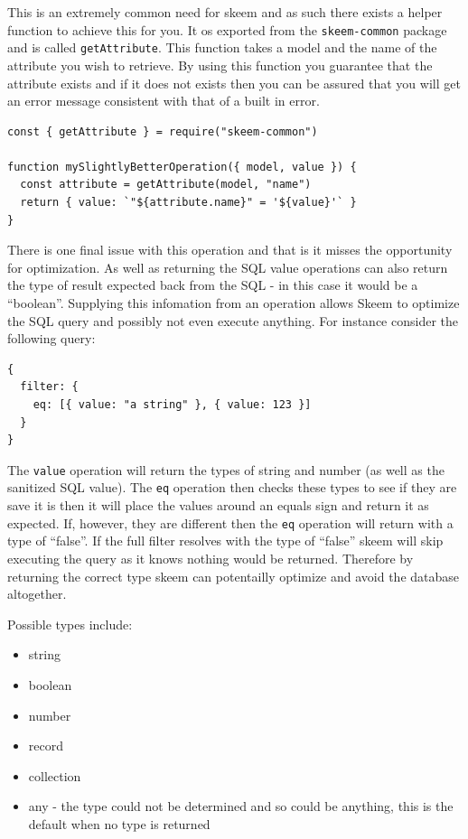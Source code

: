 \documentclass[
  12pt,
]{article}
\newcommand{\passthrough}[1]{#1}
\providecommand{\tightlist}{%
  \setlength{\itemsep}{0pt}\setlength{\parskip}{0pt}}
\begin{document}
This is an extremely common need for skeem and as such there exists a
helper function to achieve this for you. It os exported from the
\passthrough{\lstinline!skeem-common!} package and is called
\passthrough{\lstinline!getAttribute!}. This function takes a model and
the name of the attribute you wish to retrieve. By using this function
you guarantee that the attribute exists and if it does not exists then
you can be assured that you will get an error message consistent with
that of a built in error.

\begin{lstlisting}[caption={Checks to see if name actually exists on the model being queried.}]
const { getAttribute } = require("skeem-common")

function mySlightlyBetterOperation({ model, value }) {
  const attribute = getAttribute(model, "name")
  return { value: `"${attribute.name}" = '${value}'` }
}
\end{lstlisting}

There is one final issue with this operation and that is it misses the
opportunity for optimization. As well as returning the SQL value
operations can also return the type of result expected back from the SQL
- in this case it would be a ``boolean''. Supplying this infomation from
an operation allows Skeem to optimize the SQL query and possibly not
even execute anything. For instance consider the following query:

\begin{lstlisting}
{
  filter: {
    eq: [{ value: "a string" }, { value: 123 }]
  }
}
\end{lstlisting}

The \passthrough{\lstinline!value!} operation will return the types of
string and number (as well as the sanitized SQL value). The
\passthrough{\lstinline!eq!} operation then checks these types to see if
they are save it is then it will place the values around an equals sign
and return it as expected. If, however, they are different then the
\passthrough{\lstinline!eq!} operation will return with a type of
``false''. If the full filter resolves with the type of ``false'' skeem
will skip executing the query as it knows nothing would be returned.
Therefore by returning the correct type skeem can potentailly optimize
and avoid the database altogether.

Possible types include:

\begin{itemize}
\tightlist
\item
  string
\item
  boolean
\item
  number
\item
  record
\item
  collection
\item
  any - the type could not be determined and so could be anything, this
  is the default when no type is returned
\end{itemize}
\end{document}
